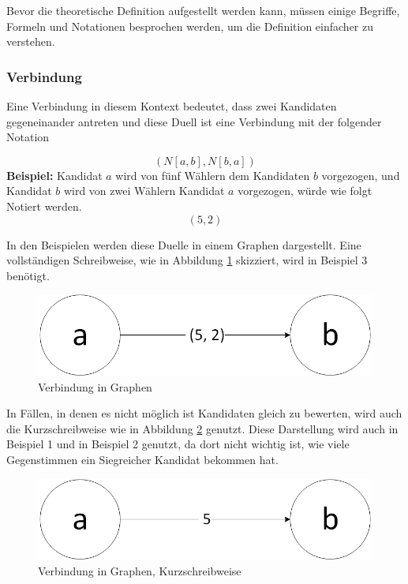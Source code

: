 Bevor die theoretische Definition aufgestellt werden kann, müssen einige Begriffe, Formeln und Notationen besprochen werden, um die Definition einfacher zu verstehen.


\subsubsection{Verbindung}
\label{verbindung}
Eine Verbindung in diesem Kontext bedeutet, dass zwei Kandidaten gegeneinander antreten und diese Duell ist eine Verbindung mit der folgender Notation

\[
(N[a,b],N[b,a])
\]
\textbf{Beispiel:}
Kandidat $a$ wird von fünf Wählern dem Kandidaten $b$ vorgezogen, und Kandidat $b$ wird von zwei Wählern Kandidat $a$ vorgezogen, würde wie folgt Notiert werden. 
\[
(5,2)
\]

In den Beispielen werden diese Duelle in einem Graphen dargestellt. Eine vollständigen Schreibweise, wie in Abbildung \ref{fig:verbindung1} skizziert, wird in Beispiel 3 benötigt.

\begin{figure}[!h]
\centering
\includegraphics[scale=0.5]{Bilder/Definitionab.png}
\caption{Verbindung in Graphen}
\label{fig:verbindung1}
\end{figure}

In Fällen, in denen es nicht möglich ist Kandidaten gleich zu bewerten, wird auch die Kurzschreibweise wie in Abbildung \ref{fig:verbindung2} genutzt. Diese Darstellung wird auch in Beispiel 1 und in Beispiel 2 genutzt, da dort nicht wichtig ist, wie viele Gegenstimmen ein Siegreicher Kandidat bekommen hat.

\begin{figure}[!h]
\centering
\includegraphics[scale=0.5]{Bilder/DefinitionShortab.png}
\caption{Verbindung in Graphen, Kurzschreibweise}
\label{fig:verbindung2}
\end{figure}

